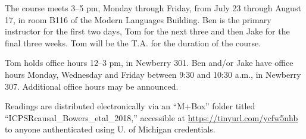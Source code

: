 The course meets 3--5 pm, Monday through Friday, from July 23 through
August 17, in room B116 of the Modern Languages Building.  
Ben is the primary instructor for the first two days, Tom for the next three and then Jake for the final three weeks. Tom will be the T.A. for the duration of the course.

Tom holds office hours 12--3 pm, in Newberry 301. Ben and/or Jake
have office hours Monday, Wednesday and Friday between 9:30 and 10:30
a.m., in Newberry 307. Additional office hours may be announced.

Readings are distributed electronically via an ``M+Box'' folder
titled ``ICPSRcausal\_Bowers\_etal\_2018,'' accessible at
\url{https://tinyurl.com/ycfw5nhb}  to anyone authenticated using
U. of Michigan credentials.  
